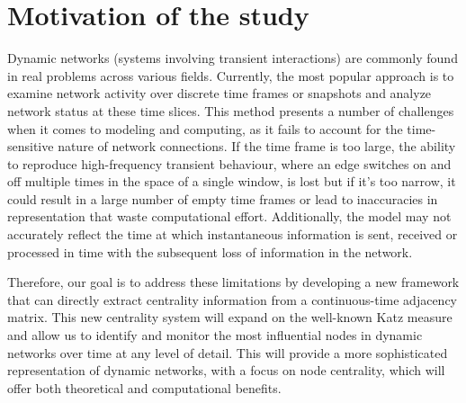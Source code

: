 \section{Motivation of the study}
\label{sec:motiv}
Dynamic networks (systems involving transient interactions) are commonly found in real problems across various fields. Currently, the most popular approach is to examine network activity over discrete time frames or snapshots and analyze network status at these time slices. This method presents a number of challenges when it comes to modeling and computing, as it fails to account for the time-sensitive nature of network connections. If the time frame is too large, the ability to reproduce high-frequency transient behaviour, where an
edge switches on and off multiple times in the space of a single window, is lost but if it's too narrow, it could result in a large number of empty time frames or lead to inaccuracies in representation that waste computational
effort. Additionally, the model may not accurately reflect the time at which instantaneous information is sent, received or processed in time with the subsequent loss of information in the network.

Therefore, our goal is to address these limitations by developing a new framework that can directly extract centrality information from a continuous-time adjacency matrix. This new centrality system will expand on the well-known Katz measure and allow us to identify and monitor the most influential nodes in dynamic networks over time at any level of detail. This will provide a more sophisticated representation of dynamic networks, with a focus on node centrality, which will offer both theoretical and computational benefits.

